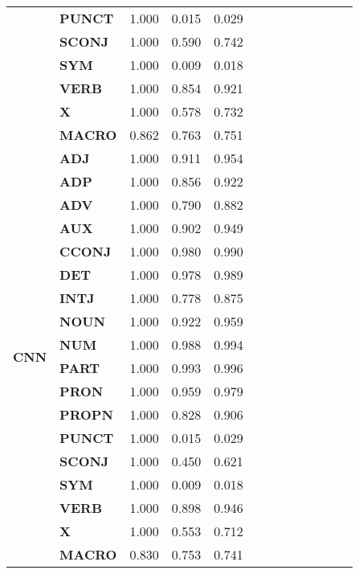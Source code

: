 \begin{longtable}{|l||l||l||l||l||l||l||l||l||l||l||l||l|}
\textbf{} & \textbf{PUNCT} & 1.000 & 0.015 & 0.029 \\
\textbf{} & \textbf{SCONJ} & 1.000 & 0.590 & 0.742 \\
\textbf{} & \textbf{SYM} & 1.000 & 0.009 & 0.018 \\
\textbf{} & \textbf{VERB} & 1.000 & 0.854 & 0.921 \\
\textbf{} & \textbf{X} & 1.000 & 0.578 & 0.732 \\
\textbf{} & \textbf{MACRO} & 0.862 & 0.763 & 0.751 \\
\cline{1-5}
\multirow[t]{18}{*}{\textbf{CNN}} & \textbf{ADJ} & 1.000 & 0.911 & 0.954 \\
\textbf{} & \textbf{ADP} & 1.000 & 0.856 & 0.922 \\
\textbf{} & \textbf{ADV} & 1.000 & 0.790 & 0.882 \\
\textbf{} & \textbf{AUX} & 1.000 & 0.902 & 0.949 \\
\textbf{} & \textbf{CCONJ} & 1.000 & 0.980 & 0.990 \\
\textbf{} & \textbf{DET} & 1.000 & 0.978 & 0.989 \\
\textbf{} & \textbf{INTJ} & 1.000 & 0.778 & 0.875 \\
\textbf{} & \textbf{NOUN} & 1.000 & 0.922 & 0.959 \\
\textbf{} & \textbf{NUM} & 1.000 & 0.988 & 0.994 \\
\textbf{} & \textbf{PART} & 1.000 & 0.993 & 0.996 \\
\textbf{} & \textbf{PRON} & 1.000 & 0.959 & 0.979 \\
\textbf{} & \textbf{PROPN} & 1.000 & 0.828 & 0.906 \\
\textbf{} & \textbf{PUNCT} & 1.000 & 0.015 & 0.029 \\
\textbf{} & \textbf{SCONJ} & 1.000 & 0.450 & 0.621 \\
\textbf{} & \textbf{SYM} & 1.000 & 0.009 & 0.018 \\
\textbf{} & \textbf{VERB} & 1.000 & 0.898 & 0.946 \\
\textbf{} & \textbf{X} & 1.000 & 0.553 & 0.712 \\
\textbf{} & \textbf{MACRO} & 0.830 & 0.753 & 0.741 \\
\cline{1-5}
\end{longtable}
